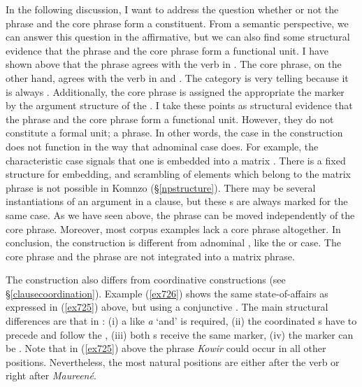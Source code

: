 In the following discussion, I want to address the question whether or not the  phrase and the core phrase form a constituent. From a semantic perspective, we can answer this question in the affirmative, but we can also find some structural evidence that the  phrase and the core phrase form a functional unit. I have shown above that the  phrase agrees with the verb in . The core phrase, on the other hand, agrees with the verb in  and . The  category is very telling because it is always . Additionally, the core phrase is assigned the appropriate the  marker by the argument structure of the . I take these points as structural evidence that the  phrase and the core phrase form a functional unit. However, they do not constitute a formal unit; a phrase. In other words, the  case in the  construction does not function in the way that adnominal case does. For example, the characteristic case signals that one  is embedded into a matrix . There is a fixed structure for embedding, and scrambling of elements which belong to the matrix phrase is not possible in Komnzo (\S{}\ref{npstructure}). There may be several instantiations of an argument in a clause, but these s are always marked for the same case. As we have seen above, the  phrase can be moved independently of the core phrase. Moreover, most corpus examples lack a core phrase altogether. In conclusion, the  construction is different from adnominal , like the  or  case. The core phrase and the  phrase are not integrated into a matrix phrase.%

The  construction also differs from coordinative constructions (see \S{}\ref{clausecoordination}). Example (\ref{ex726}) shows the same state-of-affairs as expressed in (\ref{ex725}) above, but using a conjunctive . The main structural differences are that in : (i) a  like \emph{a} `and' is required, (ii) the coordinated s have to precede and follow the , (iii) both s receive the same  marker, (iv) the  marker can be . Note that in (\ref{ex725}) above the  phrase \emph{Kowir} could occur in all other positions. Nevertheless, the most natural positions are either after the verb or right after \emph{Maureené}.

